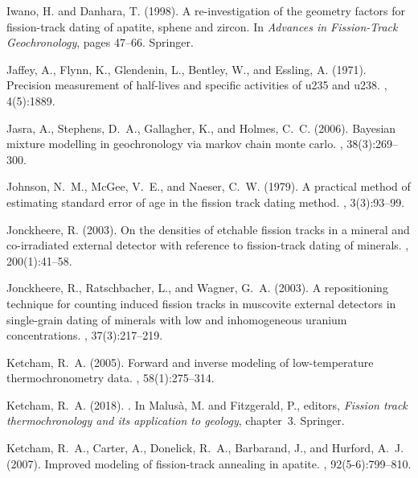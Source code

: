 \documentclass{article}
\begin{document}
\begin{thebibliography}{}
Iwano, H. and Danhara, T. (1998).
\newblock A re-investigation of the geometry factors for fission-track dating
  of apatite, sphene and zircon.
\newblock In {\em Advances in Fission-Track Geochronology}, pages 47--66.
  Springer.

Jaffey, A., Flynn, K., Glendenin, L., Bentley, W., and Essling, A. (1971).
\newblock Precision measurement of half-lives and specific activities of u235
  and u238.
, 4(5):1889.

Jasra, A., Stephens, D.~A., Gallagher, K., and Holmes, C.~C. (2006).
\newblock Bayesian mixture modelling in geochronology via markov chain monte
  carlo.
, 38(3):269--300.

Johnson, N.~M., McGee, V.~E., and Naeser, C.~W. (1979).
\newblock A practical method of estimating standard error of age in the fission
  track dating method.
, 3(3):93--99.

Jonckheere, R. (2003).
\newblock On the densities of etchable fission tracks in a mineral and
  co-irradiated external detector with reference to fission-track dating of
  minerals.
, 200(1):41--58.

Jonckheere, R., Ratschbacher, L., and Wagner, G.~A. (2003).
\newblock A repositioning technique for counting induced fission tracks in
  muscovite external detectors in single-grain dating of minerals with low and
  inhomogeneous uranium concentrations.
, 37(3):217--219.

Ketcham, R.~A. (2005).
\newblock Forward and inverse modeling of low-temperature thermochronometry
  data.
, 58(1):275--314.

Ketcham, R.~A. (2018).
.
\newblock In Malus\`{a}, M. and Fitzgerald, P., editors, {\em Fission track
  thermochronology and its application to geology}, chapter~3. Springer.

Ketcham, R.~A., Carter, A., Donelick, R.~A., Barbarand, J., and Hurford, A.~J.
  (2007).
\newblock Improved modeling of fission-track annealing in apatite.
, 92(5-6):799--810.


\end{thebibliography}
\end{document}
